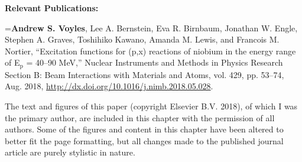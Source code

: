 \vspace{1cm}

\noindent \textbf{Relevant Publications:}

\vspace{0.5cm}




\hangindent=\parindent  \textbf{Andrew S. Voyles}, Lee A. Bernstein, Eva R. Birnbaum, Jonathan W. Engle,
Stephen A. Graves, Toshihiko Kawano, Amanda M. Lewis, and Francois M. Nortier, \enquote{Excitation functions for (p,x) reactions of niobium in the energy range of E$_{\text{p}}$ = 40--90 MeV,} Nuclear Instruments and Methods in Physics Research Section B: Beam Interactions with Materials and Atoms,  vol. 429, pp. 53--74, Aug. 2018, \url{http://dx.doi.org/10.1016/j.nimb.2018.05.028}. \cite{Voyles2018a} 





\vspace{0.5cm}




The text and figures of this paper (copyright Elsevier B.V. 2018), of which I was the primary author, are
included in this chapter with the permission of all authors. 
Some of the figures and  content in this chapter have been altered to better fit the page formatting, but all changes made to the published journal article are purely stylistic in nature.








